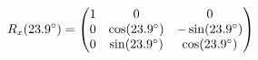 \documentclass[preview]{standalone}
\begin{document}
\begin{align*}
\special{dvisvgm:raw <g id='unique000'>}R_x(23.9^\circ) = \begin{pmatrix} 1 & 0 & 0 \\ 0 & \cos(23.9^\circ) & -\sin(23.9^\circ) \\ 0 & \sin(23.9^\circ) & \cos(23.9^\circ) \end{pmatrix}\special{dvisvgm:raw </g>}
\end{align*}
\end{document}
